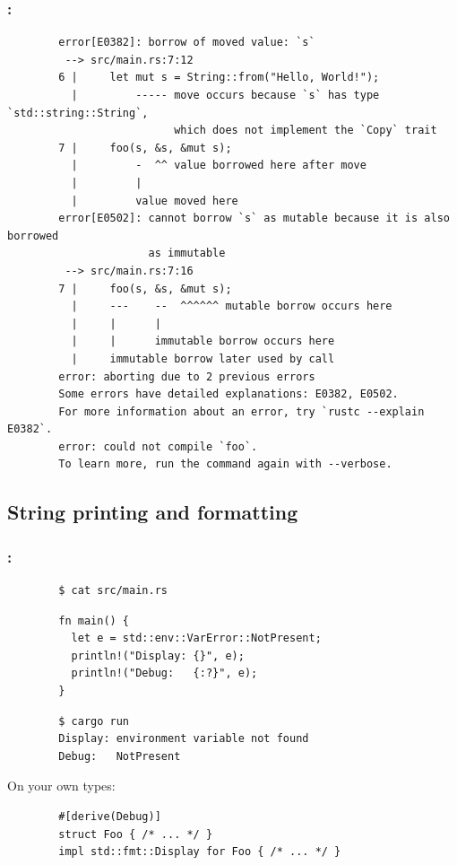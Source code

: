 \documentclass[aspectratio=43, t]{beamer}
\begin{document}
\begin{frame}[fragile]
	\frametitle{\secname: \subsecname}

	\begin{verbatim}
		error[E0382]: borrow of moved value: `s`
		 --> src/main.rs:7:12
		6 |     let mut s = String::from("Hello, World!");
		  |         ----- move occurs because `s` has type `std::string::String`,
		                  which does not implement the `Copy` trait
		7 |     foo(s, &s, &mut s);
		  |         -  ^^ value borrowed here after move
		  |         |
		  |         value moved here
		error[E0502]: cannot borrow `s` as mutable because it is also borrowed
		              as immutable
		 --> src/main.rs:7:16
		7 |     foo(s, &s, &mut s);
		  |     ---    --  ^^^^^^ mutable borrow occurs here
		  |     |      |
		  |     |      immutable borrow occurs here
		  |     immutable borrow later used by call
		error: aborting due to 2 previous errors
		Some errors have detailed explanations: E0382, E0502.
		For more information about an error, try `rustc --explain E0382`.
		error: could not compile `foo`.
		To learn more, run the command again with --verbose.
	\end{verbatim}
\end{frame}

\subsection*{String printing and formatting}
\begin{frame}[fragile]
	\frametitle{\secname: \subsecname}

	\begin{verbatim}
		$ cat src/main.rs
	\end{verbatim}
	\begin{verbatim}
		fn main() {
		  let e = std::env::VarError::NotPresent;
		  println!("Display: {}", e);
		  println!("Debug:   {:?}", e);
		}
	\end{verbatim}
	\begin{verbatim}
		$ cargo run
		Display: environment variable not found
		Debug:   NotPresent
	\end{verbatim}

	On your own types:
	\begin{verbatim}
		#[derive(Debug)]
		struct Foo { /* ... */ }
		impl std::fmt::Display for Foo { /* ... */ }
	\end{verbatim}
\end{frame}
\end{document}
